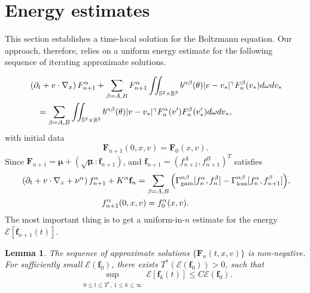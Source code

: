 \documentclass[reqno]{amsart}
\numberwithin{equation}{section}
\newtheorem{lemma}[theorem]{Lemma}
\numberwithin{equation}{section}
\begin{document}
	\section{Energy estimates}
	This section establishes a time-local solution for the Boltzmann equation. Our approach, therefore, relies on a uniform energy estimate for the following sequence of iterating approximate solutions.  
	
	\begin{align}
		&\left(\partial_t + v \cdot \nabla_x\right) F_{n+1}^{\alpha} + \sum_{\beta=A,B}F^{\alpha}_{n+1} \iint_{\mathbb{S}^2\times\mathbb{R}^3}b^{\alpha \beta}(\theta) |v-v_*|^{\gamma} F^{\beta}_n(v_*)  d\omega dv_* \notag \\
		&\quad = \sum_{\beta=A,B}\iint_{\mathbb{S}^2\times\mathbb{R}^3}b^{\alpha \beta}(\theta) |v-v_*|^{\gamma} F^{\alpha}_n(v') F^{\beta}_n(v'_*)d\omega dv_*, \label{socald70F}
	\end{align}
	with initial data 
	\begin{equation*}
	\mathbf{F}_{n+1}(0, x, v) = \mathbf{F}_{0}(x, v).
	\end{equation*}
	 Since \(  \mathbf{F}_{n+1} = \bm{\mu} + (\sqrt{\bm{\mu}}:  \mathbf{f}_{n+1}) \), and \( \mathbf{f}_{n+1}=(f_{n+1}^A,f_{n+1}^B)^T \) satisfies
	\begin{align}
		&\left(\partial_t + v \cdot \nabla_x + \nu^{\alpha}\right) f_{n+1}^{\alpha} + K^{\alpha} \mathbf{f}_{n} = \sum_{\beta=A,B} \Big(\Gamma^{\alpha\beta}_{\text{gain}}[f_n^{\alpha}, f_n^{\beta}] - \Gamma^{\alpha\beta}_{\text{loss}}[f^{\alpha}_n, f^{\beta}_{n+1}]\Big), \label{socal71f} \\
		&\hspace{3.4cm} f_{n+1}^{\alpha}(0, x, v) = f_{0}^{\alpha}(x, v). \notag
	\end{align}
	The most important thing is to get a uniform-in-$n$ estimate for the energy \( \mathcal{E}[\mathbf{f}_{n+1}(t)] \).
	
	
	\begin{lemma}\label{socedlem7}
		The sequence of approximate solutions $\{\mathbf{F}_{n}(t,x,v)\}$ is non-negative. For  sufficiently small ${\mathcal{E}}(\mathbf{f}_0)$, there exists $T^*({\mathcal{E}}(\mathbf{f}_0)) > 0$, such that 
		\begin{equation}\label{socald72}
			\sup_{\substack{0 \leq t \leq T^*,\ 1 \leq k \leq \infty}} {\mathcal{E}}[\mathbf{f}_k(t)] \leq C{\mathcal{E}}(\mathbf{f}_0).
		\end{equation}
	\end{lemma}
	
\end{document}
